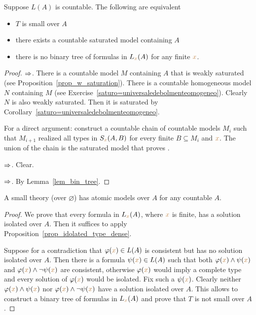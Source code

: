 \begin{proposition}\label{prop_small_equivalents}
Suppose $L(A)$ is countable.
The following are equivalent\nobreak
\begin{itemize}   
\item[1.] $T$ is small over $A$
\item[2.] there exists a countable saturated model containing $A$
\item[3.] there is no binary tree of formulas in $L_{\color{brown} x}(A)$ for any finite ${\color{brown} x}$.
\end{itemize}
\end{proposition}
\begin{proof}$\Rightarrow$. There is a countable model $M$ containing $A$ that is weakly saturated (see Proposition~\ref{prop_w_saturation}).
There is a countable homogeneous model $N$ containing $M$ (see Exercise~\ref{saturo=universaledebolmenteomogeneo}).
Clearly $N$ is also weakly saturated.
Then it is saturated by Corollary~\ref{saturo=universaledebolmenteomogeneo}.

For a direct argument: construct a countable chain of countable models $M_i$ such that $M_{i+1}$ realized all types in $S_{\color{brown} x}(A,B)$ for every finite $B\subseteq M_i$ and ${\color{brown} x}$.
The union of the chain is the saturated model that proves .

$\Rightarrow$. Clear.

$\Rightarrow$. By Lemma~\ref{lem_bin_tree}.
\end{proof}

\begin{proposition} 
A small theory (over $\varnothing$) has atomic models over $A$ for any countable $A$.
\end{proposition}
\begin{proof}
We prove that every formula in $L_{\color{brown} x}(A)$, where ${\color{brown} x}$ is finite, has a solution isolated over $A$.
Then it suffices to apply Proposition~\ref{prop_idolated_type_dense}.

Suppose for a contradiction that $\varphi({\color{brown} x})\in L(A)$ is consistent but has no solution isolated over $A$.
Then there is a formula $\psi({\color{brown} x})\in L(A)$ such that both $\varphi({\color{brown} x})\wedge\psi({\color{brown} x})$ and $\varphi({\color{brown} x})\wedge\neg\psi({\color{brown} x})$ are consistent, otherwise $\varphi({\color{brown} x})$ would imply a complete type and every solution of $\varphi({\color{brown} x})$ would be isolated.
Fix such a $\psi({\color{brown} x})$.
Clearly neither $\varphi({\color{brown} x})\wedge\psi({\color{brown} x})$ nor $\varphi({\color{brown} x})\wedge\neg\psi({\color{brown} x})$ have a solution isolated over $A$.
This allows to construct a binary tree of formulas in $L_{\color{brown} x}(A)$ and prove that $T$ is not small over $A$.
\end{proof}

